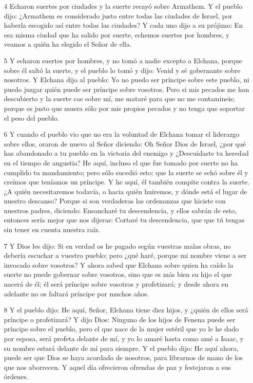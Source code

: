 \par 4 Echaron suertes por ciudades y la suerte recayó sobre Armathem. Y el pueblo dijo: ¿Armathem es considerado justo entre todas las ciudades de Israel, por haberla escogido así entre todas las ciudades? Y cada uno dijo a su prójimo: En esa misma ciudad que ha salido por suerte, echemos suertes por hombres, y veamos a quién ha elegido el Señor de ella.

\par 5 Y echaron suertes por hombres, y no tomó a nadie excepto a Elchana, porque sobre él saltó la suerte, y el pueblo lo tomó y dijo: Venid y sé gobernante sobre nosotros. Y Elchana dijo al pueblo: Yo no puedo ser príncipe sobre este pueblo, ni puedo juzgar quién puede ser príncipe sobre vosotros. Pero si mis pecados me han descubierto y la suerte cae sobre mí, me mataré para que no me contamineis; porque es justo que muera sólo por mis propios pecados y no tenga que soportar el peso del pueblo.

\par 6 Y cuando el pueblo vio que no era la voluntad de Elchana tomar el liderazgo sobre ellos, oraron de nuevo al Señor diciendo: Oh Señor Dios de Israel, ¿por qué has abandonado a tu pueblo en la victoria del enemigo y ¿Descuidaste tu heredad en el tiempo de angustia? He aquí, incluso el que fue tomado por suerte no ha cumplido tu mandamiento; pero sólo sucedió esto: que la suerte se echó sobre él y creímos que teníamos un príncipe. Y he aquí, él también compite contra la suerte. ¿A quién necesitaremos todavía, o hacia quién huiremos, y dónde está el lugar de nuestro descanso? Porque si son verdaderas las ordenanzas que hiciste con nuestros padres, diciendo: Ensancharé tu descendencia, y ellos sabrán de esto, entonces sería mejor que nos dijeras: Cortaré tu descendencia, que que tú tengas sin tener en cuenta nuestra raíz.

\par 7 Y Dios les dijo: Si en verdad os he pagado según vuestras malas obras, no debería escuchar a vuestro pueblo; pero ¿qué haré, porque mi nombre viene a ser invocado sobre vosotros? Y ahora sabed que Elchana sobre quien ha caído la suerte no puede gobernar sobre vosotros, sino que es más bien su hijo el que nacerá de él; él será príncipe sobre vosotros y profetizará; y desde ahora en adelante no os faltará príncipe por muchos años.

\par 8 Y el pueblo dijo: He aquí, Señor, Elchana tiene diez hijos, y ¿quién de ellos será príncipe o profetizará? Y dijo Dios: Ninguno de los hijos de Fenena puede ser príncipe sobre el pueblo, pero el que nace de la mujer estéril que yo le he dado por esposa, será profeta delante de mí, y yo lo amaré hasta como amé a Isaac, y su nombre estará delante de mí para siempre. Y el pueblo dijo: He aquí ahora, puede ser que Dios se haya acordado de nosotros, para librarnos de mano de los que nos aborrecen. Y aquel día ofrecieron ofrendas de paz y festejaron a sus órdenes.

